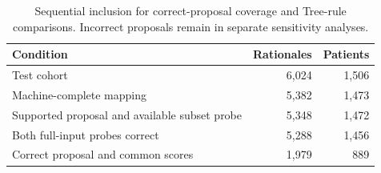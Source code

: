 \begin{table}[!tbp]\centering\footnotesize
\caption{Sequential inclusion for correct-proposal coverage and Tree-rule comparisons. Incorrect proposals remain in separate sensitivity analyses.}\label{tab:rq2-flow}
\begin{tabular}{lrr}\toprule
Condition & Rationales & Patients \\ \midrule
Test cohort & 6,024 & 1,506 \\
Machine-complete mapping & 5,382 & 1,473 \\
Supported proposal and available subset probe & 5,348 & 1,472 \\
Both full-input probes correct & 5,288 & 1,456 \\
Correct proposal and common scores & 1,979 & 889 \\
\bottomrule\end{tabular}
\end{table}
